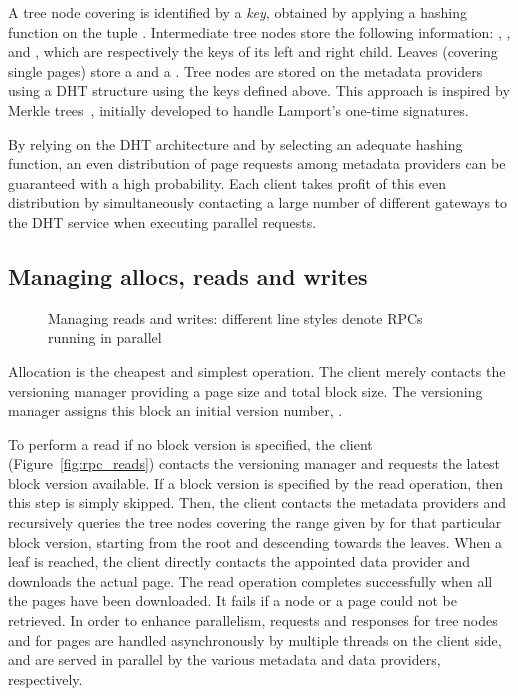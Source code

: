 \documentclass{llncs}
\begin{document}
A tree node covering  is identified by a \emph{key},
obtained by applying a hashing function on the tuple .  Intermediate tree nodes store the
following information: , ,  and ,
which are respectively the keys of its left and right child. Leaves
(covering single pages) store a  and a .  Tree
nodes are stored on the metadata providers using a DHT structure using
the keys defined above. This approach is inspired by Merkle
trees~\cite{Mer88Signature}, initially developed to handle Lamport's one-time
signatures.

By relying on the DHT architecture and by selecting an adequate hashing
function, an even distribution of page requests among metadata
providers can be guaranteed with a high probability. Each client takes
profit of this even distribution by simultaneously contacting a large
number of different gateways to the DHT service when executing parallel
requests.

\subsection{Managing allocs, reads and writes}
\label{sec:how}

\begin{figure}
\centerline{
\hfill
{}\hfill
{}\hfill
}
\caption{Managing reads and writes: different line styles denote
    RPCs running in parallel}
  \label{fig:Reads and writes}
\end{figure}

Allocation is the cheapest and simplest operation. The client merely
contacts the versioning manager providing a page size and total block
size. The versioning manager assigns this block an initial version number, .



To perform a read if no block version is specified, the client
(Figure~\ref{fig:rpc_reads}) contacts the versioning manager and requests
the latest block version available. If a block version is specified by the
read operation, then this step is simply skipped. Then, the client contacts
the metadata providers and recursively queries  the tree nodes
covering the range given by  for that particular block
version, starting from the root and descending towards the leaves. When
a leaf is reached, the client directly contacts the appointed data provider
and downloads the actual page. The read operation completes
successfully when all the pages have been downloaded. It fails if a node or
a page could not be retrieved.  In order to enhance
parallelism, requests and responses for tree nodes and for pages are
handled asynchronously by multiple threads on the client side, and are
served in parallel by the various metadata and data providers,
respectively.
\end{document}
